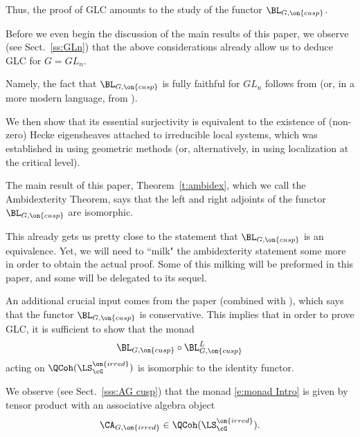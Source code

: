\documentclass[9pt]{amsart}
\theoremstyle{remark}
\theoremstyle{definition}
\theoremstyle{remark}
\newcommand{\thmref}[1]{Theorem~\ref{#1}}
\newcommand{\secref}[1]{Sect.~\ref{#1}}
\numberwithin{equation}{section}
\begin{document}
\medskip

Thus, the proof of GLC amounts to the study of the functor $\BL_{G,\on{cusp}}$.

\sssec{}

Before we even begin the discussion of the main results of this paper, we observe (see \secref{ss:GLn})
that the above considerations already allow us to deduce GLC for $G=GL_n$.

\medskip

Namely, the fact that $\BL_{G,\on{cusp}}$ is fully faithful for $GL_n$ follows from \cite{Ga2} (or, in a more modern language,
from \cite{Be1}). 

\medskip

We then show that its essential surjectivity is equivalent to the existence of (non-zero) Hecke eigensheaves
attached to irreducible local systems, which was established in \cite{FGV} using geometric methods (or, alternatively, in 
\cite{BD1} using localization at the critical level). 

\sssec{}

The main result of this paper, \thmref{t:ambidex}, which we call the Ambidexterity Theorem, says that the left and right adjoints
of the functor $\BL_{G,\on{cusp}}$ are isomorphic. 

\medskip

This already gets us pretty close to the statement that $\BL_{G,\on{cusp}}$ is an equivalence. Yet, we will need to ``milk" the
ambidexterity statement some more in order to obtain the actual proof. Some of this milking will be preformed in this paper,
and some will be delegated to its sequel.

\sssec{}

An additional crucial input comes from the paper \cite{FR} (combined with \cite{Be2}), which says that the functor $\BL_{G,\on{cusp}}$ is conservative. 
This implies that in order to prove GLC, it is sufficient to show that the monad
\begin{equation} \label{e:monad Intro}
\BL_{G,\on{cusp}}\circ \BL_{G,\on{cusp}}^L
\end{equation}
acting on $\QCoh(\LS^{\on{irred}}_\cG)$ is isomorphic to the identity functor.

\medskip

We observe (see \secref{sss:AG cusp}) that the monad \eqref{e:monad Intro} is given by tensor product with an associative algebra object 
\begin{equation} \label{e:A G Intro}
\CA_{G,\on{irred}}\in \QCoh(\LS^{\on{irred}}_\cG).
\end{equation} 
\end{document}
